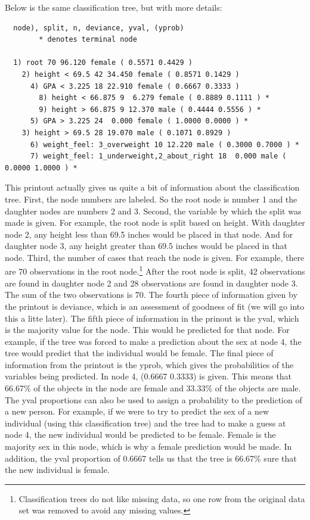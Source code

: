\documentclass[12pt,twoside]{reedthesis}
\begin{document}
  Below is the same classification tree, but with more details:
  
  \begin{verbatim}
  node), split, n, deviance, yval, (yprob)
        * denotes terminal node
  
  1) root 70 96.120 female ( 0.5571 0.4429 )  
    2) height < 69.5 42 34.450 female ( 0.8571 0.1429 )  
      4) GPA < 3.225 18 22.910 female ( 0.6667 0.3333 )  
        8) height < 66.875 9  6.279 female ( 0.8889 0.1111 ) *
        9) height > 66.875 9 12.370 male ( 0.4444 0.5556 ) *
      5) GPA > 3.225 24  0.000 female ( 1.0000 0.0000 ) *
    3) height > 69.5 28 19.070 male ( 0.1071 0.8929 )  
      6) weight_feel: 3_overweight 10 12.220 male ( 0.3000 0.7000 ) *
      7) weight_feel: 1_underweight,2_about_right 18  0.000 male ( 0.0000 1.0000 ) *
  \end{verbatim}
  
  This printout actually gives us quite a bit of information about the
  classification tree. First, the node numbers are labeled. So the root
  node is number 1 and the daughter nodes are numbers 2 and 3. Second, the
  variable by which the split was made is given. For example, the root
  node is split based on height. With daughter node 2, any height less
  than 69.5 inches would be placed in that node. And for daughter node 3,
  any height greater than 69.5 inches would be placed in that node. Third,
  the number of cases that reach the node is given. For example, there are
  70 observations in the root node.\footnote{Classification trees do not
    like missing data, so one row from the original data set was removed
    to avoid any missing values.} After the root node is split, 42
  observations are found in daughter node 2 and 28 observations are found
  in daughter node 3. The sum of the two observations is 70. The fourth
  piece of information given by the printout is deviance, which is an
  assessment of goodness of fit (we will go into this a litte later). The
  fifth piece of information in the prinout is the yval, which is the
  majority value for the node. This would be predicted for that node. For
  example, if the tree was forced to make a prediction about the sex at
  node 4, the tree would predict that the individual would be female. The
  final piece of information from the printout is the yprob, which gives
  the probabilities of the variables being predicted. In node 4, (0.6667
  0.3333) is given. This means that 66.67\% of the objects in the node are
  female and 33.33\% of the objects are male. The yval proportions can
  also be used to assign a probability to the prediction of a new person.
  For example, if we were to try to predict the sex of a new individual
  (using this classification tree) and the tree had to make a guess at
  node 4, the new individual would be predicted to be female. Female is
  the majority sex in this node, which is why a female prediction would be
  made. In addition, the yval proportion of 0.6667 tells us that the tree
  is 66.67\% sure that the new individual is female.
  
\end{document}
